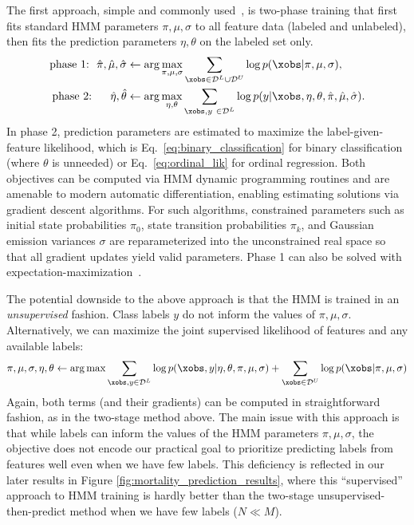 The first approach, simple and commonly used~\citep{sotoodeh2019improving}, is two-phase training that first fits standard HMM parameters $\pi, \mu, \sigma$ to all feature data (labeled and unlabeled), then fits the prediction parameters $\eta, \theta$ on the labeled set only.
\begin{align}
\text{phase 1:}~~
\hat{\pi}, \hat{\mu}, \hat{\sigma} &\gets \arg\max_{\pi, \mu, \sigma} \sum_{\xobs \in \mathcal{D}^L \cup \mathcal{D}^U} \log p( \xobs | \pi, \mu, \sigma ),
\label{eq:objective_two_stage}
\\ \notag 
\text{phase 2:}~~~~~
\hat{\eta}, \hat{\theta} &\gets \arg \max_{\eta, \theta} \sum_{\xobs, y ~\in \mathcal{D}^L} \log p( y | \xobs, \eta, \theta, \hat{\pi}, \hat{\mu}, \hat{\sigma}).
\end{align}
In phase 2, prediction parameters are estimated to maximize the label-given-feature likelihood, which is Eq.~\eqref{eq:binary_classification} for binary classification (where $\theta$ is unneeded) or Eq.~\eqref{eq:ordinal_lik} for ordinal regression.
Both objectives can be computed via HMM dynamic programming routines and are amenable to modern automatic differentiation, enabling estimating solutions via gradient descent algorithms.
For such algorithms, constrained parameters such as initial state probabilities \(\pi_0\), state transition probabilities \(\pi_k\), and Gaussian emission variances \(\sigma\) are reparameterized into the unconstrained real space so that all gradient updates yield valid parameters.
Phase 1 can also be solved with expectation-maximization~\citep{ghahramaniIntroductionHiddenMarkov2001b}.

The potential downside to the above approach is that the HMM is trained in an \emph{unsupervised} fashion. Class labels $y$ do not inform the values of $\pi, \mu, \sigma$.
Alternatively, we can maximize the joint supervised likelihood of features and any available labels: 
\begin{align}
    \pi, \mu, \sigma, \eta, \theta \gets
        \arg \max \sum_{\xobs, y \in \mathcal{D}^L}
            \log p( \xobs, y | \eta, \theta, \pi, \mu, \sigma) 
    + \sum_{\xobs \in \mathcal{D}^U}
    \log p( \xobs | \pi, \mu, \sigma)
\label{eq:objective_supervised_joint}
\end{align}
Again, both terms (and their gradients) can be computed in straightforward fashion, as in the two-stage method above.
The main issue with this approach is that while labels can inform the values of the HMM parameters $\pi, \mu, \sigma$, the objective does not encode our practical goal to prioritize predicting labels from features well even when we have few labels. 
This deficiency is reflected in our later results in Figure \ref{fig:mortality_prediction_results}, where this ``supervised'' approach to HMM training is hardly better than the two-stage unsupervised-then-predict method when we have few labels ($N \ll M$).

